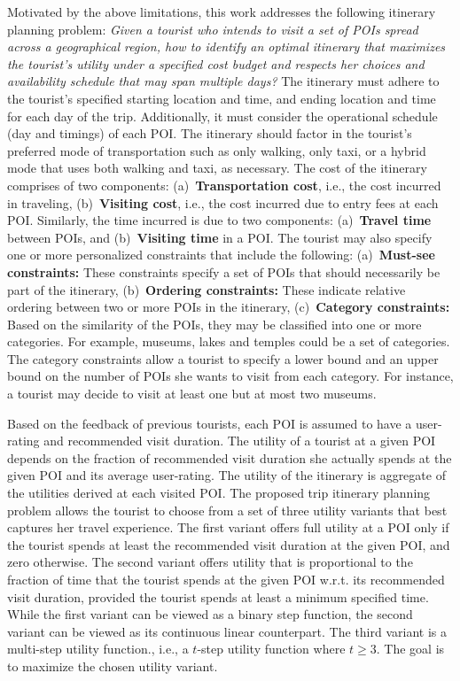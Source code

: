 Motivated by the above limitations, this work addresses the following itinerary planning problem: \emph{Given a tourist who intends to visit a set of POIs spread across a geographical region, how to  identify an optimal itinerary that maximizes the tourist's utility under a specified cost budget and respects her choices and availability schedule that may span multiple days?} The itinerary must adhere to the tourist's specified starting location and time, and ending location and time for each day of the trip. Additionally, it must consider the operational schedule (day and timings) of each POI. The itinerary should factor in the tourist's preferred mode of transportation such as only walking, only taxi, or a hybrid mode that uses both walking and taxi, as necessary. The cost of the itinerary comprises of two components: (a)~\textbf{Transportation cost}, i.e., the cost incurred in traveling, (b)~\textbf{Visiting cost}, i.e., the cost incurred due to entry fees at each POI. Similarly, the time incurred is due to two components: (a)~\textbf{Travel time} between POIs, and (b)~\textbf{Visiting time} in a POI. The tourist may also specify one or more personalized constraints that include the following: (a)~\textbf{Must-see constraints:} These constraints specify a set of POIs that should necessarily be part of the itinerary, (b)~\textbf{Ordering constraints:} These indicate relative ordering between two or more POIs in the itinerary, (c)~\textbf{Category constraints:} Based on the similarity of the POIs, they may be classified into one or more categories. For example, museums, lakes and temples could be a set of categories. The category constraints allow a tourist to specify a lower bound and an upper bound on the number of POIs she wants to visit from each category. For instance, a tourist may decide to visit at least one but at most two museums. 

Based on the feedback of previous tourists, each POI is assumed to have a user-rating and recommended visit duration. The utility of a tourist at a given POI depends on the fraction of recommended visit duration she actually spends at the given POI and its average user-rating. The utility of the itinerary is aggregate of the utilities derived at each visited POI. The proposed trip itinerary planning problem allows the tourist to choose from a set of three utility variants that best captures her travel experience. The first variant offers full utility at a POI only if the tourist spends at least the recommended visit duration at the given POI, and zero otherwise. The second variant offers utility that is proportional to the fraction of time that the tourist spends at the given POI w.r.t. its recommended visit duration, provided the tourist  spends at least a minimum specified time. While the first variant can be viewed as a binary step function, the second variant can be viewed as its continuous linear counterpart. The third variant is a multi-step utility function., i.e., a $t$-step utility function where $t \ge 3$. The goal is to maximize the chosen utility variant.

